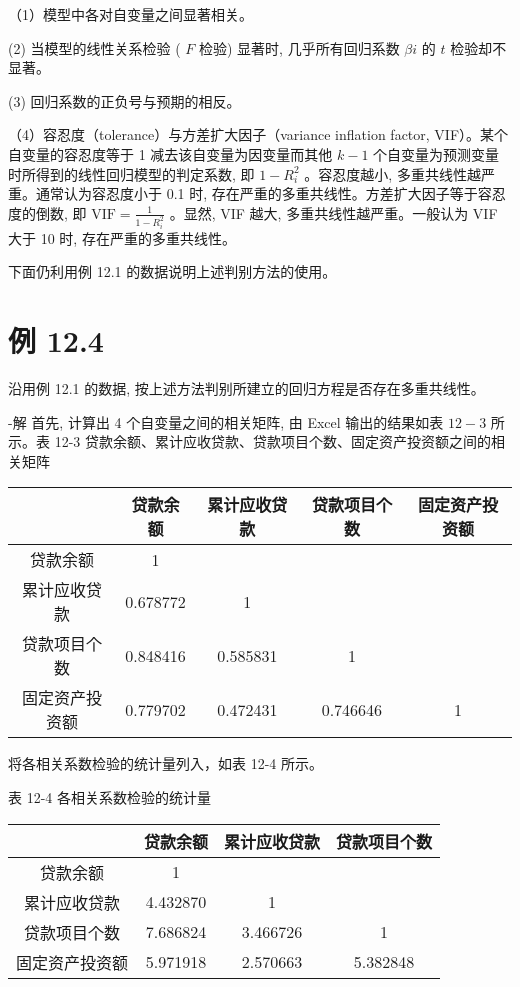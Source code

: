 \documentclass[10pt]{article}
\begin{document}
\begin{CJK*}{UTF8}{bsmi}
（1）模型中各对自变量之间显著相关。

(2) 当模型的线性关系检验 ( $F$ 检验) 显著时, 几乎所有回归系数 $\beta i$ 的 $t$ 检验却不显著。

(3) 回归系数的正负号与预期的相反。

（4）容忍度（tolerance）与方差扩大因子（variance inflation factor, VIF）。某个自变量的容忍度等于 1 减去该自变量为因变量而其他 $k-1$ 个自变量为预测变量时所得到的线性回归模型的判定系数, 即 $1-R_{i}^{2}$ 。容忍度越小, 多重共线性越严重。通常认为容忍度小于 0.1 时, 存在严重的多重共线性。方差扩大因子等于容忍度的倒数, 即 $\mathrm{VIF}=\frac{1}{1-R_{i}^{2}}$ 。显然, VIF 越大, 多重共线性越严重。一般认为 VIF 大于 10 时, 存在严重的多重共线性。

下面仍利用例 12.1 的数据说明上述判别方法的使用。

\section*{例 12.4}
沿用例 12.1 的数据, 按上述方法判别所建立的回归方程是否存在多重共线性。

-解 首先, 计算出 4 个自变量之间的相关矩阵, 由 Excel 输出的结果如表 $12-3$ 所示。表 12-3 贷款余额、累计应收贷款、贷款项目个数、固定资产投资额之间的相关矩阵

\begin{center}
\begin{tabular}{ccccc}
\hline
 & 贷款余额 & 累计应收贷款 & 贷款项目个数 & 固定资产投资额 \\
\hline
贷款余额 & 1 &  &  &  \\
累计应收贷款 & 0.678772 & 1 &  &  \\
贷款项目个数 & 0.848416 & 0.585831 & 1 &  \\
固定资产投资额 & 0.779702 & 0.472431 & 0.746646 & 1 \\
\hline
\end{tabular}
\end{center}

将各相关系数检验的统计量列入，如表 12-4 所示。

表 12-4 各相关系数检验的统计量

\begin{center}
\begin{tabular}{cccc}
\hline
 & 贷款余额 & 累计应收贷款 & 贷款项目个数 \\
\hline
贷款余额 & 1 &  &  \\
累计应收贷款 & 4.432870 & 1 &  \\
贷款项目个数 & 7.686824 & 3.466726 & 1 \\
固定资产投资额 & 5.971918 & 2.570663 & 5.382848 \\
\hline
\end{tabular}
\end{center}


\end{CJK*}
\end{document}

